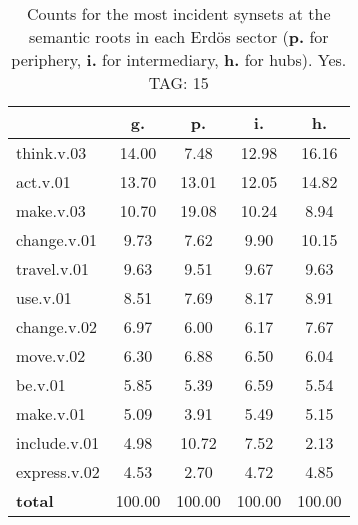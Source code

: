 \begin{table}[h!]
\begin{center}
\begin{tabular}{| l || c | c | c | c |}\hline
 & {\bf g.} & {\bf p.} & {\bf i.} & {\bf h.} \\\hline\hline
think.v.03 & 14.00  & 7.48  & 12.98  & 16.16 \\\hline
act.v.01 & 13.70  & 13.01  & 12.05  & 14.82 \\\hline
make.v.03 & 10.70  & 19.08  & 10.24  & 8.94 \\\hline
change.v.01 & 9.73  & 7.62  & 9.90  & 10.15 \\\hline
travel.v.01 & 9.63  & 9.51  & 9.67  & 9.63 \\\hline
use.v.01 & 8.51  & 7.69  & 8.17  & 8.91 \\\hline
change.v.02 & 6.97  & 6.00  & 6.17  & 7.67 \\\hline
move.v.02 & 6.30  & 6.88  & 6.50  & 6.04 \\\hline
be.v.01 & 5.85  & 5.39  & 6.59  & 5.54 \\\hline
make.v.01 & 5.09  & 3.91  & 5.49  & 5.15 \\\hline
include.v.01 & 4.98  & 10.72  & 7.52  & 2.13 \\\hline
express.v.02 & 4.53  & 2.70  & 4.72  & 4.85 \\\hline\hline
{{\bf total}} & 100.00  & 100.00  & 100.00  & 100.00 \\\hline
\end{tabular}
\caption{Counts for the most incident synsets at the semantic roots in each Erd\"os sector ({\bf p.} for periphery, {\bf i.} for intermediary, {\bf h.} for hubs). Yes. TAG: 15}
\end{center}
\end{table}